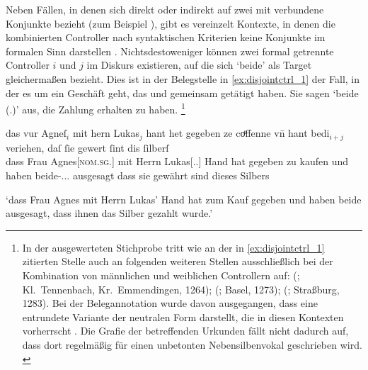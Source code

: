 Neben Fällen, in denen sich  direkt oder indirekt auf zwei mit
 verbundene Konjunkte bezieht (zum Beispiel ), gibt es vereinzelt Kontexte, in denen die
kombinierten Controller nach syntaktischen Kriterien keine Konjunkte im
formalen Sinn darstellen \autocite[vgl.~auch][247--248]{askedal1973}.
Nichtsdestoweniger können zwei formal getrennte Controller $i$ und $j$ im
Diskurs existieren, auf die sich  `beide' als Target
gleichermaßen bezieht. Dies ist in der Belegstelle in \cref{ex:disjointctrl_1}
der Fall, in der es um ein Geschäft geht, das  und 
gemeinsam getätigt haben. Sie sagen  `beide (\N.\Pl)' aus, die
Zahlung erhalten zu haben.%
%
	\footnote{In der ausgewerteten Stichprobe tritt  wie an der in
		\cref{ex:disjointctrl_1} zitierten Stelle auch an folgenden weiteren
		Stellen ausschließlich bei der Kombination von männlichen und
		weiblichen Controllern auf: 
		(\cite{cao1}; Kl.~Tennenbach, Kr.~Emmendingen, 1264);
		 (\cite{cao1}; Basel, 1273);
		 (\cite{cao5}; Straßburg, 1283). Bei
		der Belegannotation wurde davon ausgegangen, dass  eine
		entrundete Variante der neutralen Form  darstellt, die in
		diesen Kontexten vorherrscht \autocites(siehe auch
		\cref{sec:caoalemschwa})[vgl.][41]{paul2007}. Die Grafie der
		betreffenden Urkunden fällt nicht dadurch auf, dass dort regelmäßig
		 für einen unbetonten Nebensilbenvokal geschrieben wird.
		\label{fn:caoalemschwa}}

\begin{exe}
\ex\label{ex:disjointctrl_1}
	\setlength{\glossglue}{6pt plus 2pt minus 2pt}
	\gll das vur Agneſ$_i$ mit hern Lukas$_j$ hant \textelp{}
			het gegeben ze coͧffenne \textelp{} vn̄ hant bedi$_{i+j}$
			veriehen, daſ ſie gewert ſint dis ſilberſ \\
		dass Frau Agnes[\textsc{nom.sg.\FemF}] mit Herrn Lukas[\Dat.\Sg.\MascM] Hand
			{} hat gegeben zu kaufen {} und haben beide-\Nom.\Pl.\N\subMF.\St{}
			ausgesagt dass sie gewährt sind dieses Silbers \\
	\begin{taggedline}{\parencites(Straßburg, 1281)[\pno~N~202, 156.11--16]{cao5}}
		\trans `dass Frau Agnes mit Herrn Lukas' Hand \textelp{} hat zum
			Kauf gegeben \textelp{} und haben beide ausgesagt, dass ihnen das
			Silber gezahlt wurde.'
	\end{taggedline}
\end{exe}%


